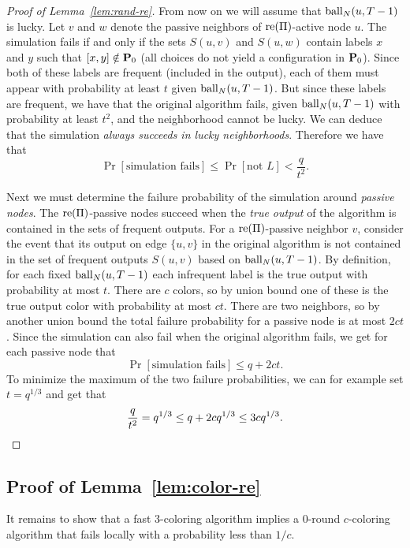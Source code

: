 \begin{proof}[Proof of Lemma~\ref{lem:rand-re}]
From now on we will assume that $\operatorname{ball}_N(u,T-1)$ is lucky. Let $v$ and $w$ denote the passive neighbors of $\operatorname{re}(\Pi)$-active node $u$. The simulation fails if and only if the sets $S(u,v)$ and $S(u,w)$ contain labels $x$ and $y$ such that $[x,y] \notin \mathbf{P}_0$ (all choices do not yield a configuration in $\mathbf{P}_0$). Since both of these labels are frequent (included in the output), each of them must appear with probability at least $t$ given $\operatorname{ball}_N(u,T-1)$. But since these labels are frequent, we have that the original algorithm fails, given $\operatorname{ball}_N(u,T-1)$ with probability at least $t^2$, and the neighborhood cannot be lucky. We can deduce that the simulation \emph{always succeeds in lucky neighborhoods}. Therefore we have that
\[
	\Pr[\text{simulation fails}] \leq \Pr[\text{not } L] < \frac{q}{t^2}.
\]

Next we must determine the failure probability of the simulation around \emph{passive nodes}. The $\operatorname{re}(\Pi)$-passive nodes succeed when the \emph{true output} of the algorithm is contained in the sets of frequent outputs. For a $\operatorname{re}(\Pi)$-passive neighbor $v$, consider the event that its output on edge $\{u,v\}$ in the original algorithm is not contained in the set of frequent outputs $S(u,v)$ based on $\operatorname{ball}_N(u,T-1)$. By definition, for each fixed $\operatorname{ball}_N(u,T-1)$ each infrequent label is the true output with probability at most $t$. There are $c$ colors, so by union bound one of these is the true output color with probability at most $ct$. There are two neighbors, so by another union bound the total failure probability for a passive node is at most $2ct$. Since the simulation can also fail when the original algorithm fails, we get for each passive node that
\[
	\Pr[\text{simulation fails}] \leq q + 2ct.
\]
To minimize the maximum of the two failure probabilities, we can for example set $t = q^{1/3}$ and get that
\[
	\frac{q}{t^2} = q^{1/3} \leq q + 2cq^{1/3} \leq 3cq^{1/3}. \qedhere
\]
\end{proof}

\subsection{Proof of Lemma~\ref{lem:color-re}} \label{ssec:prob-re}

It remains to show that a fast 3-coloring algorithm implies a 0-round $c$-coloring algorithm that fails locally with a probability less than $1/c$.

